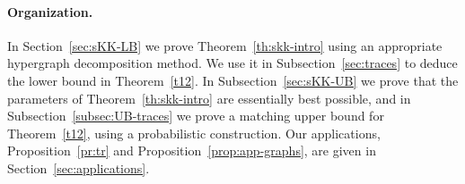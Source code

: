 \documentclass[11pt]{article}
\newcommand{\FF}{{\cal F}}
\newcommand{\N}{\mathbb{N}}
\DeclareMathOperator{\trace}{Tr}
\begin{document}
\paragraph{Organization.}
In Section~\ref{sec:sKK-LB} we prove Theorem~\ref{th:skk-intro} using 
an appropriate 
hypergraph decomposition method. 
We use it in Subsection~\ref{sec:traces} to deduce the lower bound in Theorem~\ref{t12}. 
In Subsection~\ref{sec:sKK-UB} we prove that the parameters of Theorem~\ref{th:skk-intro} are essentially best possible, and  in Subsection~\ref{subsec:UB-traces} we prove a matching upper 
bound for Theorem~\ref{t12}, 
using a probabilistic construction.
Our applications, Proposition~\ref{pr:tr} and Proposition~\ref{prop:app-graphs}, are given in Section~\ref{sec:applications}.

\end{document}

